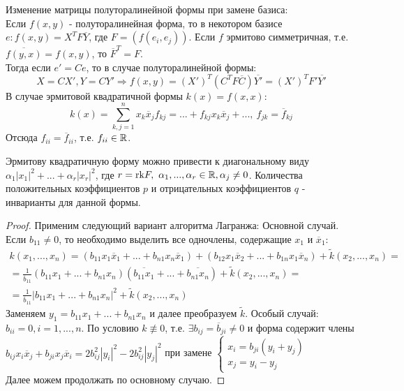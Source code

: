Изменение матрицы полуторалинейной формы при замене базиса:\\
Если $f(x, y)$ - полуторалинейная форма, то в некотором базисе $e: f(x, y) = X^TF\overline{Y}$, где $F = (f(e_i, e_j))$. Если $f$ эрмитово симметричная, т.е. $\overline{f(y, x)} = f(x, y)$, то $\overline{F}^T = F$.\\
Тогда если $e' = Ce$, то в случае полуторалинейной формы:
$$X = CX', Y = CY' \Rightarrow f(x, y) = (X')^T(C^TF\overline{C})\overline{Y'} = (X')^TF'\overline{Y'}$$
В случае эрмитовой квадратичной формы $k(x) = f(x,x)$:
$$k(x) = \sum \limits_{k,j = 1}^n x_k\overline{x}_jf_{kj} = ... + f_{kj}x_k\overline{x}_j + ... , \ f_{jk} = \overline{f}_{kj}$$
Отсюда $f_{ii} = \overline{f}_{ii}$, т.е. $f_{ii} \in \mathbb{R}$.
\begin{theorem}
    Эрмитову квадратичную форму можно привести к диагональному виду $\alpha_1|x_1|^2 + ... + \alpha_r|x_r|^2$, где $r = \text{rk} F, \ \alpha_1,...,\alpha_r \in \mathbb{R}, \alpha_j \neq 0$. Количества положительных коэффициентов $p$ и отрицательных коэффициентов $q$ - инварианты для данной формы. 
\end{theorem}
\begin{proof}
    Применим следующий вариант алгоритма Лагранжа:
    Основной случай. Если $b_{11} \neq 0$, то необходимо выделить все одночлены, содержащие $x_1$ и $\overline{x}_1$:
    \begin{multline*}
    k(x_1,...,x_n) = (b_{11}x_1\overline{x}_1 + ... + b_{n1}x_n\overline{x}_1) + (b_{12}x_1\overline{x}_2 + ... + b_{1n}x_1\overline{x}_n) + \tilde{k}(x_2,...,x_n) =\\= \frac{1}{\overline{b}_{11}}(b_{11}x_1 + ... + b_{n1}x_n)(\overline{b_{11}x_1} + ... + \overline{b_{n1}x_n}) + \tilde{k}(x_2,...,x_n) =\\= \frac{1}{\overline{b}_{11}}|b_{11}x_1 + ... + b_{n1}x_n|^2 + \tilde{k}(x_2,...,x_n)
    \end{multline*}
    Заменяем $y_1 = b_{11}x_1 + ... + b_{n1}x_n$ и далее преобразуем $\tilde{k}$.
    Особый случай: $b_{ii} = 0, i = 1,...,n$. По условию $k \not \equiv 0$, т.е. $\exists b_{ij} = \overline{b}_{ji} \neq 0$ и форма содержит члены $b_{ij}x_i\overline{x}_j + b_{ji}x_j\overline{x}_i = 2b_{ij}^2|y_i|^2 - 2b_{ij}^2|y_j|^2$ при замене $\begin{cases}
        x_i = b_{ji}(y_i + y_j)\\
        x_j = y_i - y_j
    \end{cases}$\\
    Далее можем продолжать по основному случаю.
\end{proof}

